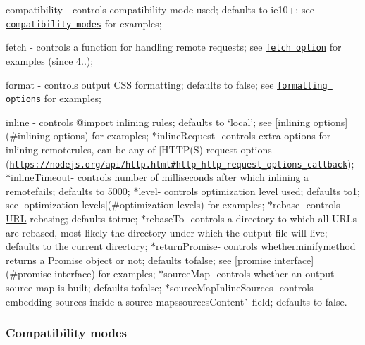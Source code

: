 \begin{DoxyItemize}
\item {\ttfamily compatibility} -\/ controls compatibility mode used; defaults to {\ttfamily ie10+}; see \href{#compatibility-modes}{\tt compatibility modes} for examples;
\item {\ttfamily fetch} -\/ controls a function for handling remote requests; see \href{#fetch-option}{\tt fetch option} for examples (since 4..);
\item {\ttfamily format} -\/ controls output C\+SS formatting; defaults to {\ttfamily false}; see \href{#formatting-options}{\tt formatting options} for examples;
\item {\ttfamily inline} -\/ controls {\ttfamily @import} inlining rules; defaults to `\textquotesingle{}local'{\ttfamily ; see \mbox{[}inlining options\mbox{]}(\#inlining-\/options) for examples; $\ast$}inline\+Request{\ttfamily -\/ controls extra options for inlining remote}{\ttfamily rules, can be any of \mbox{[}H\+T\+T\+P(\+S) request options\mbox{]}(\href{https://nodejs.org/api/http.html#http_http_request_options_callback}{\tt https\+://nodejs.\+org/api/http.\+html\#http\+\_\+http\+\_\+request\+\_\+options\+\_\+callback}); $\ast$}inline\+Timeout{\ttfamily -\/ controls number of milliseconds after which inlining a remote}{\ttfamily fails; defaults to 5000; $\ast$}level{\ttfamily -\/ controls optimization level used; defaults to}1{\ttfamily ; see \mbox{[}optimization levels\mbox{]}(\#optimization-\/levels) for examples; $\ast$}rebase{\ttfamily -\/ controls \mbox{\hyperlink{namespace_u_r_l}{U\+RL}} rebasing; defaults to}true{\ttfamily ; $\ast$}rebase\+To{\ttfamily -\/ controls a directory to which all U\+R\+Ls are rebased, most likely the directory under which the output file will live; defaults to the current directory; $\ast$}return\+Promise{\ttfamily -\/ controls whether}minify{\ttfamily method returns a Promise object or not; defaults to}false{\ttfamily ; see \mbox{[}promise interface\mbox{]}(\#promise-\/interface) for examples; $\ast$}source\+Map{\ttfamily -\/ controls whether an output source map is built; defaults to}false{\ttfamily ; $\ast$}source\+Map\+Inline\+Sources{\ttfamily -\/ controls embedding sources inside a source map\textquotesingle{}s}sources\+Content\`{} field; defaults to false.
\end{DoxyItemize}

\subsubsection*{Compatibility modes}

